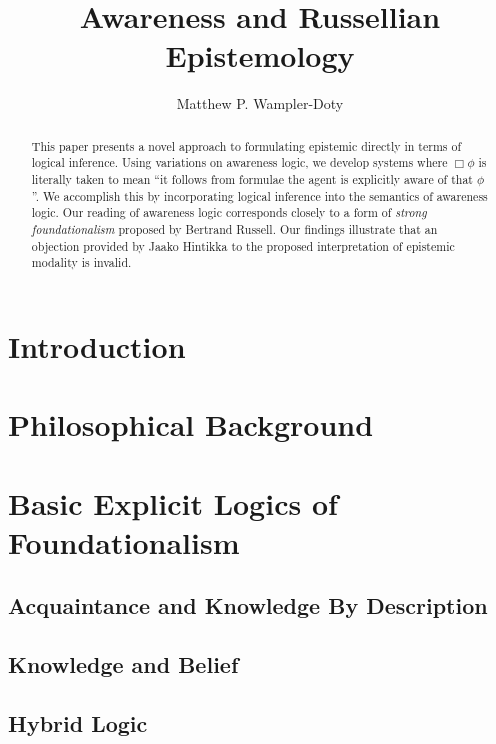 \documentclass[smallextended]{svjour3}
\begin{document}
\title{Awareness and Russellian Epistemology}\author{Matthew P.
Wampler-Doty}\date{}\maketitle

\begin{abstract}
This paper presents a novel approach to formulating epistemic directly
in terms of logical inference.  Using variations on awareness logic,
we develop systems where $\Box \phi$ is
literally taken to mean ``it follows from formulae the agent is explicitly aware of
that $\phi$''.  We accomplish this by incorporating logical inference into the semantics
of awareness logic.  Our reading of awareness logic corresponds
closely to a form of \emph{strong foundationalism} proposed by Bertrand
Russell\cite{russell_problems_1936}.  Our findings illustrate that an
objection provided by Jaako Hintikka\cite{hintikka_knowledge_1969} to
the proposed interpretation of epistemic modality is invalid.
\end{abstract}

\section{Introduction}
\label{intro}


\section{Philosophical Background}
\label{trad}


\section{Basic Explicit Logics of Foundationalism}

\subsection{Acquaintance and Knowledge By Description}
\label{awarenesslogic0}


\subsection{Knowledge and Belief}
\label{awarenesslogic}


\subsection{Hybrid Logic}
\label{hybrid_awareness}

\end{document}
